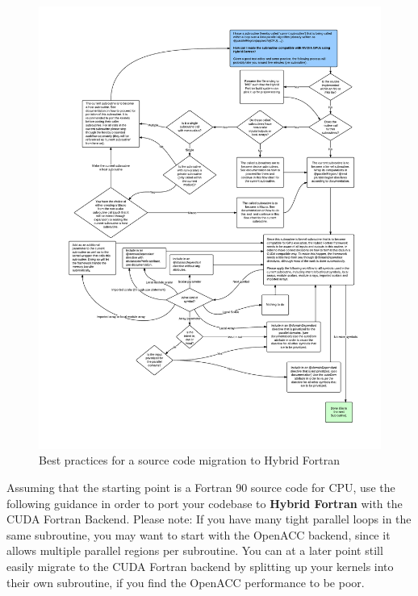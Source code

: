 \begin{figure}[hbtp]
  \centering  \includegraphics[width=16cm]{figures/HybridFortranGPUCompatibleCode.pdf}
  \caption [Best practices source code migration]{Best practices for a source code migration to Hybrid Fortran}
  \label{figure:bestPractMigration}
\end{figure}

Assuming that the starting point is a Fortran 90 source code for CPU, use the following guidance in order to port your codebase to \textbf{Hybrid Fortran} with the CUDA Fortran Backend. Please note: If you have many tight parallel loops in the same subroutine, you may want to start with the OpenACC backend, since it allows multiple parallel regions per subroutine. You can at a later point still easily migrate to the CUDA Fortran backend by splitting up your kernels into their own subroutine, if you find the OpenACC performance to be poor.


